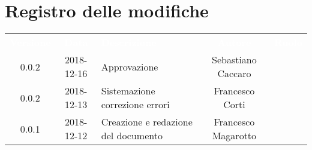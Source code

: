 \section*{Registro delle modifiche}
{
	\renewcommand{\arraystretch}{1.5}
	\centering
	\begin{longtable}{ c c  C{4cm}  c  c }
		
		\textcolor{white}{\textbf{Versione}} & \textcolor{white}{\textbf{Data}} & \textcolor{white}{\textbf{Descrizione}} & \textcolor{white}{\textbf{Autore}} & \textcolor{white}{\textbf{Ruolo}}\\	
		
		0.0.2 & 2018-12-16 & Approvazione & Sebastiano Caccaro & \Res{} \\
		
		0.0.2 & 2018-12-13 & Sistemazione correzione errori & Francesco Corti & \ver{} \\
		
		0.0.1 & 2018-12-12 & Creazione e redazione del documento & Francesco Magarotto & \reda{} \\
		
	\end{longtable}

}